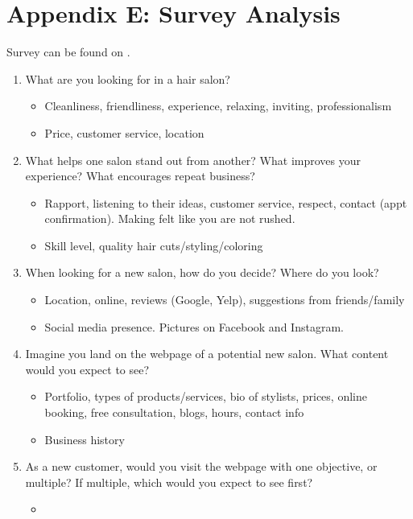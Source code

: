 \section{Appendix E: Survey Analysis}

Survey can be found on .

\begin{enumerate}
\item
  What are you looking for in a hair salon?
  \begin{itemize}
  \item
    Cleanliness, friendliness, experience, relaxing, inviting, professionalism
  \item
    Price, customer service, location
  \end{itemize}
\item
  What helps one salon stand out from another? What improves your experience? What encourages repeat business?
  \begin{itemize}
  \item
    Rapport, listening to their ideas, customer service, respect, contact (appt confirmation). Making felt like you are not rushed.
  \item
    Skill level, quality hair cuts/styling/coloring
  \end{itemize}
\item
  When looking for a new salon, how do you decide? Where do you look?
  \begin{itemize}
  \item
    Location, online, reviews (Google, Yelp), suggestions from friends/family
  \item
    Social media presence. Pictures on Facebook and Instagram.
  \end{itemize}
\item
  Imagine you land on the webpage of a potential new salon. What content would you expect to see?
  \begin{itemize}
  \item
    Portfolio, types of products/services, bio of stylists, prices, online booking, free consultation, blogs, hours, contact info
  \item
    Business history
  \end{itemize}
\item
  As a new customer, would you visit the webpage with one objective, or multiple? If multiple, which would you expect to see first?
  \begin{itemize}
  \item

\end{itemize}
\end{enumerate}
